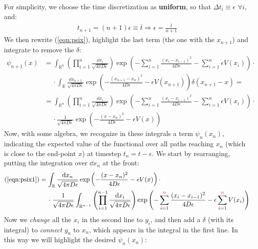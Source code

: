 \documentclass[../template.tex]{subfiles}
\begin{document}
\medskip

For simplicity, we choose the time discretization as \textbf{uniform}, so that $\Delta t_i \equiv \epsilon$ $\forall i$, and:
\begin{align*}
    t_{n+1} = (n+1) \epsilon \equiv \bar{t} \Rightarrow \epsilon = \frac{\bar{t}}{n+1}   
\end{align*}  
We then rewrite (\ref{eqn:psix}), highlight the last term (the one with the $x_{n+1}$) and integrate to remove the $\delta$:
\begin{align} \nonumber
    \psi_{n+1}(x) &= \int_{\mathbb{R}^n} \left(\prod_{i=1}^{n} \frac{\dd{x_i}}{\sqrt{4 \pi D \epsilon}} \right) \exp\left(-\sum_{i=1}^n \frac{(x_i - x_{i-1})^2}{4 D \epsilon} - \sum_{i=1}^{n} \epsilon V(x_i)\right) \cdot \\ \nonumber
    &\quad \> \cdot \int_{\mathbb{R}} \frac{\dd{x_{n+1}}}{\sqrt{4 \pi D \epsilon }} \exp\left(-\frac{(x_{n+1} - x_n)^2}{4 D \epsilon} - \epsilon V(x_{n+1})   \right) \delta(x_{n+1} - x) =\\ \nonumber
    &= \int_{\mathbb{R}^n} \left(\prod_{i=1}^{n} \frac{\dd{x_i}}{\sqrt{4 \pi D \epsilon}} \right) \exp\left(-\sum_{i=1}^n \frac{(x_i - x_{i-1})^2}{4 D \epsilon} - \sum_{i=1}^{n} \epsilon V(x_i)\right) \cdot \\ 
    &\quad \> \cdot \frac{1}{\sqrt{4 \pi D \epsilon }} \exp\left(-\frac{(x - x_n)^2}{4 D \epsilon} - \epsilon V(x)   \right) \label{eqn:psix1}
\end{align}
Now, with some algebra, we recognize in these integrals a term $\psi_n(x_n)$, indicating the expected value of the functional over all paths reaching $x_n$ (which is close to the end-point $x$) at timestep $t_n = t - \epsilon$. We start by rearranging, putting the integration over $\dd{x_n}$ at the front:
\begin{align} \nonumber
    (\ref{eqn:psix1}) &= \int_{\mathbb{R}} \frac{\dd{x_n}}{\sqrt{4 \pi D \epsilon} } \exp\left(-\frac{(x- x_n)^2}{4 D \epsilon} - \epsilon V(x) \right) \cdot \\
    &\quad \> \cdot \frac{1}{\sqrt{4 \pi D \epsilon}}  \int_{\mathbb{R}^{n-1}} \left(\prod_{i=1}^{n-1} \frac{\dd{x_i}}{\sqrt{4 \pi D \epsilon}} \right) \exp\left(-\sum_{i=1}^{\textcolor{Red}{n}} \frac{(x_i - x_{i-1})^2}{4 D \epsilon}  - \epsilon\sum_{i=1}^{\textcolor{Red}{n}} V(x_i) \right)
    \label{eqn:psix2}
\end{align}
Now we \textit{change} all the $x_i$ in the second line to $y_i$, and then add a $\delta$ (with its integral) to \textit{connect} $y_n$ to $x_n$, which appears in the integral in the first line. In this way we will highlight the desired $\psi_n(x_n)$:
\end{document}
